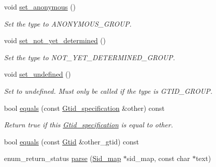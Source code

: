 \begin{DoxyCompactItemize}
void \mbox{\hyperlink{structGtid__specification_abbccfa0e057200ab56af5887ca967976}{set\+\_\+anonymous}} ()
\begin{DoxyCompactList}\small\item\em Set the type to A\+N\+O\+N\+Y\+M\+O\+U\+S\+\_\+\+G\+R\+O\+UP. \end{DoxyCompactList}\item 
\mbox{\label{structGtid__specification_a0c7872b15be0f47903813beeaaaf743c}} 
void \mbox{\hyperlink{structGtid__specification_a0c7872b15be0f47903813beeaaaf743c}{set\+\_\+not\+\_\+yet\+\_\+determined}} ()
\begin{DoxyCompactList}\small\item\em Set the type to N\+O\+T\+\_\+\+Y\+E\+T\+\_\+\+D\+E\+T\+E\+R\+M\+I\+N\+E\+D\+\_\+\+G\+R\+O\+UP. \end{DoxyCompactList}\item 
\mbox{\label{structGtid__specification_ac11af1773aa79146d5048614600bdd82}} 
void \mbox{\hyperlink{structGtid__specification_ac11af1773aa79146d5048614600bdd82}{set\+\_\+undefined}} ()
\begin{DoxyCompactList}\small\item\em Set to undefined. Must only be called if the type is G\+T\+I\+D\+\_\+\+G\+R\+O\+UP. \end{DoxyCompactList}\item 
\mbox{\label{structGtid__specification_a7f5dc8787cf48d8d6d699a657118f142}} 
bool \mbox{\hyperlink{structGtid__specification_a7f5dc8787cf48d8d6d699a657118f142}{equals}} (const \mbox{\hyperlink{structGtid__specification}{Gtid\+\_\+specification}} \&other) const
\begin{DoxyCompactList}\small\item\em Return true if this \mbox{\hyperlink{structGtid__specification}{Gtid\+\_\+specification}} is equal to \textquotesingle{}other\textquotesingle{}. \end{DoxyCompactList}\item 
bool \mbox{\hyperlink{structGtid__specification_ae3ba0f41c29ccc4a2af08392b7d32e6a}{equals}} (const \mbox{\hyperlink{structGtid}{Gtid}} \&other\+\_\+gtid) const
\item 
enum\+\_\+return\+\_\+status \mbox{\hyperlink{structGtid__specification_aac8ea9239e9e8a92f6970a172c58f5c0}{parse}} (\mbox{\hyperlink{classSid__map}{Sid\+\_\+map}} $\ast$sid\+\_\+map, const char $\ast$text)

\end{DoxyCompactItemize}

